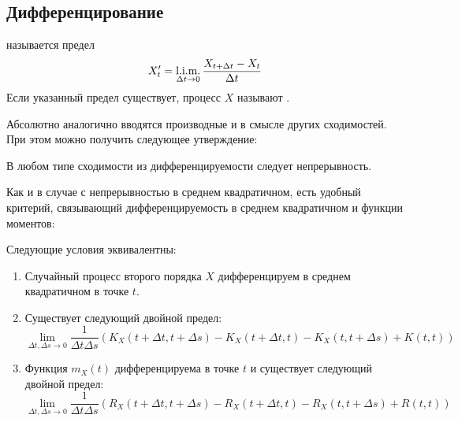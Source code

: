 \subsection{Дифференцирование} \label{subsection:derivative}

\begin{definition}
    \label{definition:calculus:derivative}
     называется предел
    \[
        X_t' = \operatorname*{\textnormal{l.i.m.}}_{\Delta t \to 0} \frac{X_{t + \Delta t} - X_t}{\Delta t}
    \]
    Если указанный предел существует, процесс $ X $ называют .
\end{definition}

Абсолютно аналогично вводятся производные и в смысле других сходимостей.
При этом можно получить следующее утверждение:

\begin{statement}
    \label{statement:calculus:continuity_from_differentiability}
    В любом типе сходимости из дифференцируемости следует непрерывность.
\end{statement}

Как и в случае с непрерывностью в среднем квадратичном,
есть удобный критерий, связывающий дифференцируемость в среднем квадратичном и функции моментов:

\begin{theorem}
    \label{theorem:calculus:mean_squares_differentiability_test}
    Следующие условия эквивалентны:
    \begin{enumerate}
        \item
            Случайный процесс второго порядка $ X $ дифференцируем в среднем квадратичном в точке $ t $.
        \item
            Существует следующий двойной предел:
            \[
                \lim_{\Delta t, \Delta s \to 0} \frac{1}{\Delta t \Delta s}
                \left( K_X(t + \Delta t, t + \Delta s) - K_X(t + \Delta t, t) - K_X(t, t + \Delta s) + K(t, t) \right)
            \]
        \item
            Функция $ m_X(t) $ дифференцируема в точке $ t $ и существует следующий двойной предел:
            \[
                \lim_{\Delta t, \Delta s \to 0} \frac{1}{\Delta t \Delta s}
                \left( R_X(t + \Delta t, t + \Delta s) - R_X(t + \Delta t, t) - R_X(t, t + \Delta s) + R(t, t) \right)
            \]
    \end{enumerate}
\end{theorem}

